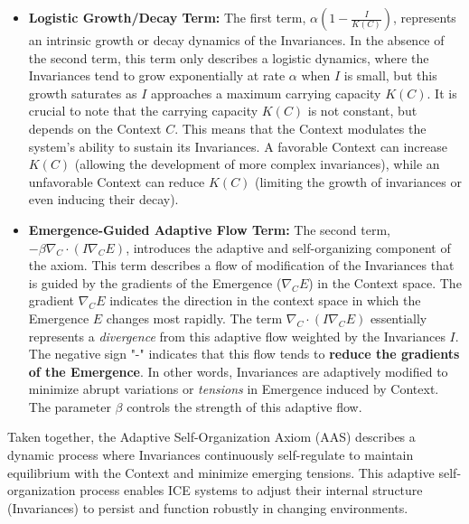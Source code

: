\documentclass{article}
\begin{document}
\begin{itemize}
\item \textbf{Logistic Growth/Decay Term:} The first term, $\alpha \left(1 - \frac{I}{K(C)}\right)$, represents an intrinsic growth or decay dynamics of the Invariances. In the absence of the second term, this term only describes a logistic dynamics, where the Invariances tend to grow exponentially at rate $\alpha$ when $I$ is small, but this growth saturates as $I$ approaches a maximum carrying capacity $K(C)$. It is crucial to note that the carrying capacity $K(C)$ is not constant, but depends on the Context $C$. This means that the Context modulates the system's ability to sustain its Invariances. A favorable Context can increase $K(C)$ (allowing the development of more complex invariances), while an unfavorable Context can reduce $K(C)$ (limiting the growth of invariances or even inducing their decay).

\item \textbf{Emergence-Guided Adaptive Flow Term:} The second term, $- \beta \nabla_C \cdot (I \nabla_C E)$, introduces the adaptive and self-organizing component of the axiom. This term describes a flow of modification of the Invariances that is guided by the gradients of the Emergence ($\nabla_C E$) in the Context space. The gradient $\nabla_C E$ indicates the direction in the context space in which the Emergence $E$ changes most rapidly. The term $\nabla_C \cdot (I \nabla_C E)$ essentially represents a \textit{divergence} from this adaptive flow weighted by the Invariances $I$. The negative sign "-" indicates that this flow tends to \textbf{reduce the gradients of the Emergence}. In other words, Invariances are adaptively modified to minimize abrupt variations or \textit{tensions} in Emergence induced by Context. The parameter $\beta$ controls the strength of this adaptive flow.

\end{itemize}

Taken together, the Adaptive Self-Organization Axiom (AAS) describes a dynamic process where Invariances continuously self-regulate to maintain equilibrium with the Context and minimize emerging tensions. This adaptive self-organization process enables ICE systems to adjust their internal structure (Invariances) to persist and function robustly in changing environments.
\end{document}
